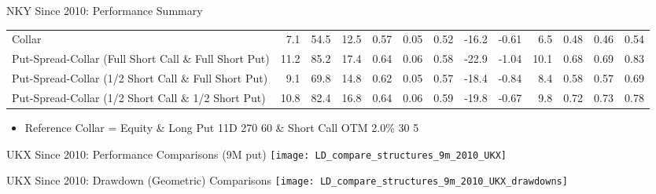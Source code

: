 \documentclass{beamer}
\begin{document}
\begin{frame}{NKY Since 2010: Performance Summary}
{\begin{tabular}{lrrrrrrrrrrrr}
Collar & 7.1 & 54.5 & 12.5 & 0.57 & 0.05 & 0.52 & -16.2 & -0.61 & 6.5 & 0.48 & 0.46 & 0.54\\
Put-Spread-Collar (Full Short Call \& Full Short Put) & 11.2 & 85.2 & 17.4 & 0.64 & 0.06 & 0.58 & -22.9 & -1.04 & 10.1 & 0.68 & 0.69 & 0.83\\
Put-Spread-Collar (1/2 Short Call \& Full Short Put) & 9.1 & 69.8 & 14.8 & 0.62 & 0.05 & 0.57 & -18.4 & -0.84 & 8.4 & 0.58 & 0.57 & 0.69\\
Put-Spread-Collar (1/2 Short Call \& 1/2 Short Put) & 10.8 & 82.4 & 16.8 & 0.64 & 0.06 & 0.59 & -19.8 & -0.67 & 9.8 & 0.72 & 0.73 & 0.78\\
\midrule
\bottomrule
\end{tabular}

}

\begin{itemize}
\item {\footnotesize Reference Collar = Equity \& Long Put 11D 270 60 \& Short Call OTM 2.0\% 30 5}
\end{itemize}

\end{frame}

\begin{frame}{UKX Since 2010: Performance Comparisons (9M put)}
\texttt{[image: LD\_compare\_structures\_9m\_2010\_UKX]}
\end{frame}

\begin{frame}{UKX Since 2010: Drawdown (Geometric) Comparisons}
\texttt{[image: LD\_compare\_structures\_9m\_2010\_UKX\_drawdowns]}
\end{frame}
\end{document}
